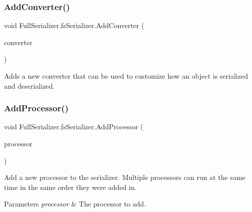 \subsubsection{\texorpdfstring{Add\+Converter()}{AddConverter()}}
{\footnotesize\ttfamily void Full\+Serializer.\+fs\+Serializer.\+Add\+Converter (\begin{DoxyParamCaption}\item[{\hyperlink{class_full_serializer_1_1fs_base_converter}{fs\+Base\+Converter}}]{converter }\end{DoxyParamCaption})\hspace{0.3cm}{\ttfamily [inline]}}



Adds a new converter that can be used to customize how an object is serialized and deserialized. 

\mbox{\label{class_full_serializer_1_1fs_serializer_a30ed281d93548dcb4deea1815096f87b}} 
\subsubsection{\texorpdfstring{Add\+Processor()}{AddProcessor()}}
{\footnotesize\ttfamily void Full\+Serializer.\+fs\+Serializer.\+Add\+Processor (\begin{DoxyParamCaption}\item[{\hyperlink{class_full_serializer_1_1fs_object_processor}{fs\+Object\+Processor}}]{processor }\end{DoxyParamCaption})\hspace{0.3cm}{\ttfamily [inline]}}



Add a new processor to the serializer. Multiple processors can run at the same time in the same order they were added in. 


\begin{DoxyParams}{Parameters}
{\em processor} & The processor to add.\\
\hline
\end{DoxyParams}
\mbox{\label{class_full_serializer_1_1fs_serializer_a720cc782d2299ee7a1050905d224a12c}} 
